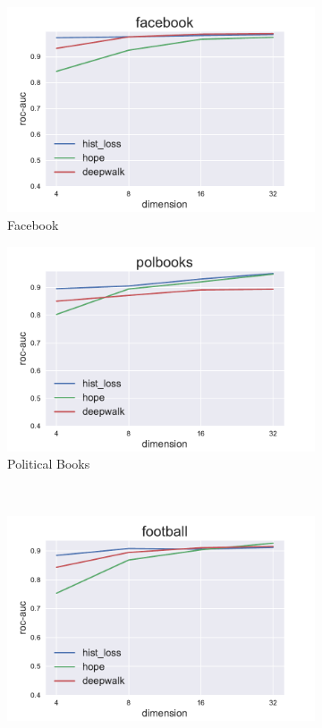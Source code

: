 \documentclass[12pt,a4paper]{extarticle}
\begin{document}
    \begin{figure}
    \begin{subfigure}{.5\linewidth}
    \centering
    \includegraphics[width=\linewidth]{src/images/Link_prediction_facebook.pdf}
    \caption{Facebook}
    \label{fig:lp_face}
    \end{subfigure}
    \begin{subfigure}{.5\linewidth}
    \centering
    \includegraphics[width=\linewidth]{src/images/Link_prediction_polbooks.pdf}
    \caption{Political Books}
    \label{fig:lp_pol}
    \end{subfigure}
    \\[1ex]
    \begin{subfigure}{.5\linewidth}
    \centering
    \includegraphics[width=\linewidth]{src/images/Link_prediction_football.pdf}

\end{subfigure}
\end{figure}
\end{document}
